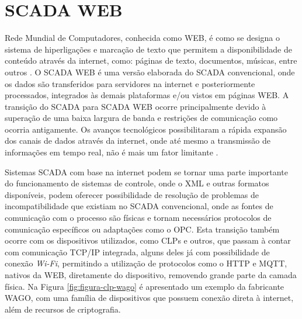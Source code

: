     \begin{figure}[!h]
    \end{figure}
    
    \quad
    
    
\section{SCADA WEB}
\label{sec:scadaweb}

Rede Mundial de Computadores, conhecida como \gls{WEB}, é como se designa o sistema de hiperligações e marcação de texto que permitem a disponibilidade de conteúdo através da internet, como: páginas de texto, documentos, músicas, entre outros \cite{W3C}. O \gls{SCADA} \gls{WEB} é uma versão elaborada do SCADA convencional, onde os dados são transferidos para servidores na internet e posteriormente processados, integrados às demais plataformas e/ou vistos em páginas WEB. A transição do SCADA para \gls{SCADA} \gls{WEB} ocorre principalmente devido à superação de uma baixa largura de banda e restrições de comunicação como ocorria antigamente. Os avanços tecnológicos possibilitaram a rápida expansão dos canais de dados através da internet, onde até mesmo a transmissão de informações em tempo real, não é mais um fator limitante \cite{ScadaWebSimp}.

Sistemas \gls{SCADA} com base na internet podem se tornar uma parte importante do funcionamento de sistemas de controle, onde o \gls{XML} e outras formatos disponíveis, podem oferecer possibilidade de resolução de problemas de incompatibilidade que existiam no \gls{SCADA} convencional, onde as fontes de comunicação com o processo são físicas e tornam necessários protocolos de comunicação específicos ou adaptações como o \gls{OPC}. Esta transição também ocorre com os dispositivos utilizados, como \glspl{CLP} e outros, que passam à contar com comunicação \gls{TCP/IP} integrada, alguns deles já com possibilidade de conexão \textit{Wi-Fi}, permitindo a utilização de protocolos como o \gls{HTTP} e \gls{MQTT}, nativos da \gls{WEB}, diretamente do dispositivo, removendo grande parte da camada física. Na Figura \ref{fig:figura-clp-wago} é apresentado um exemplo da fabricante WAGO, com uma família de dispositivos que possuem conexão direta à internet, além de recursos de criptografia.

